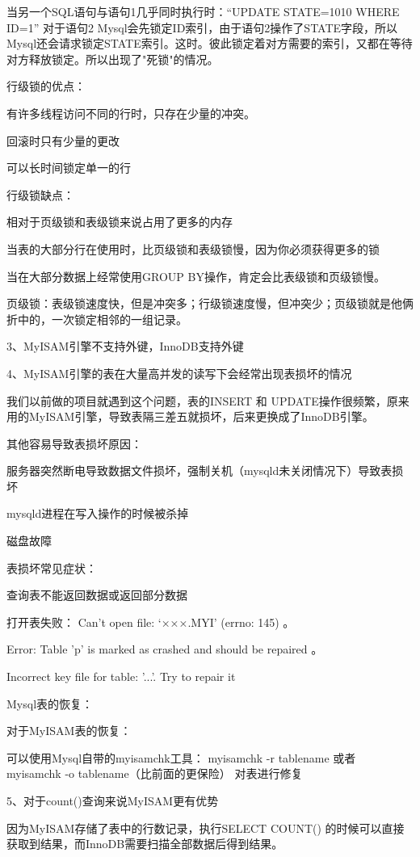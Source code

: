 \documentclass[UTF8]{ctexart}
\begin{document}
当另一个SQL语句与语句1几乎同时执行时：“UPDATE STATE=1010 WHERE ID=1”  对于语句2 Mysql会先锁定ID索引，由于语句2操作了STATE字段，所以Mysql还会请求锁定STATE索引。这时。彼此锁定着对方需要的索引，又都在等待对方释放锁定。所以出现了"死锁"的情况。
 
行级锁的优点：
 
有许多线程访问不同的行时，只存在少量的冲突。
 
回滚时只有少量的更改
 
可以长时间锁定单一的行
 
行级锁缺点：
 
相对于页级锁和表级锁来说占用了更多的内存
 
当表的大部分行在使用时，比页级锁和表级锁慢，因为你必须获得更多的锁
 
当在大部分数据上经常使用GROUP BY操作，肯定会比表级锁和页级锁慢。
 
页级锁：表级锁速度快，但是冲突多；行级锁速度慢，但冲突少；页级锁就是他俩折中的，一次锁定相邻的一组记录。

3、MyISAM引擎不支持外键，InnoDB支持外键

4、MyISAM引擎的表在大量高并发的读写下会经常出现表损坏的情况
 
我们以前做的项目就遇到这个问题，表的INSERT 和 UPDATE操作很频繁，原来用的MyISAM引擎，导致表隔三差五就损坏，后来更换成了InnoDB引擎。
 
其他容易导致表损坏原因：
 
服务器突然断电导致数据文件损坏，强制关机（mysqld未关闭情况下）导致表损坏
 
mysqld进程在写入操作的时候被杀掉
 
磁盘故障
 
表损坏常见症状：
 
查询表不能返回数据或返回部分数据
 
打开表失败： Can’t open file: ‘×××.MYI’ (errno: 145) 。
 
Error: Table 'p' is marked as crashed and should be repaired 。

Incorrect key file for table: '...'. Try to repair it
 
Mysql表的恢复：

对于MyISAM表的恢复：

可以使用Mysql自带的myisamchk工具： myisamchk -r tablename  或者 myisamchk -o tablename（比前面的更保险） 对表进行修复

5、对于count()查询来说MyISAM更有优势

因为MyISAM存储了表中的行数记录，执行SELECT COUNT() 的时候可以直接获取到结果，而InnoDB需要扫描全部数据后得到结果。
\end{document}

